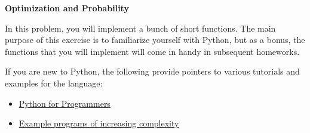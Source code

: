 \item {\bf Optimization and Probability}

In this problem, you will implement a bunch of short functions.  The main
purpose of this exercise is to familiarize yourself with Python, but as a bonus,
the functions that you will implement will come in handy in subsequent
homeworks.

If you are new to Python, the following provide pointers to various tutorials
and examples for the language:
\begin{itemize}
  \item \href{http://wiki.python.org/moin/BeginnersGuide/Programmers}{Python for Programmers}
  \item \href{http://wiki.python.org/moin/SimplePrograms}{Example programs of increasing complexity}
\end{itemize}

\begin{enumerate}

  

  

  

  

  

  

  

\end{enumerate}
